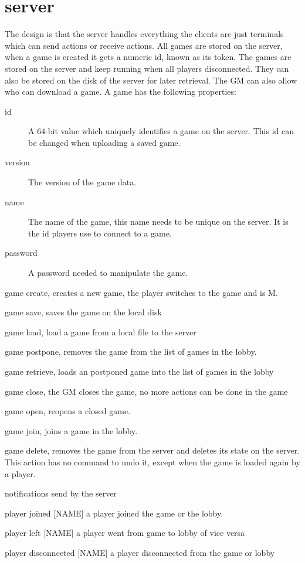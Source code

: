 \chapter{server}
\label{chapter:server}

The design is that the server handles everything the clients are just
terminals which can send actions or receive actions. All games are stored on
the server, when a game is created it gets a numeric id, known as its token.
The games are stored on the server and keep running when all players
disconnected. They can also be stored on the disk of the server for later
retrieval. The GM can also allow who can download a game. A game has the
following properties:
\begin{description}
\item[id]
	A \mbox{$64$-bit} value which uniquely identifies a game on the server.
	This id can be changed when uploading a saved game.

\item[version]
	The version of the game data.

\item[name]
	The name of the game, this name needs to be unique on the server. It is
	the id players use to connect to a game.

\item[password]
	A password needed to manipulate the game.


\end{description}

game create, creates a new game, the player switches to the game and is M.

game save, saves the game on the local disk

game load, load a game from a local file to the server

game postpone, removes the game from the list of games in the lobby.

game retrieve, loads an postponed game into the list of games in the lobby

game close, the GM closes the game, no more actions can be done in the game

game open, reopens a closed game.

game join, joins a game in the lobby.

game delete, removes the game from the server and deletes its state on the
server. This action has no command to undo it, except when the game is
loaded again by a player.


notifications send by the server

player joined [NAME] a player joined the game or the lobby.

player left [NAME] a player went from game to lobby of vice versa

player disconnected [NAME] a player disconnected from the game or lobby



